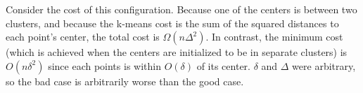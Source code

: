 \begin{example}
Consider the cost of this configuration. Because one of the centers is
between two clusters, and because the k-means cost is the sum of the
squared distances to each point's center, the total cost is
$\Omega(n\Delta^2)$. In contrast, the minimum cost (which is achieved
when the centers are initialized to be in separate clusters) is
$O(n\delta^2)$ since each points is within $O(\delta)$ of its center.
$\delta$ and $\Delta$ were arbitrary, so the bad case is arbitrarily
worse than the good case.
\end{example}




